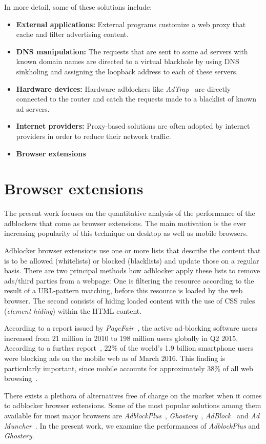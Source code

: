 In more detail, some of these solutions include:

\begin{itemize}
 \item \textbf{External applications:} External programs customize a web proxy that cache and filter advertising content.
 \item \textbf{DNS manipulation:} The requests that are sent to some ad servers with known domain names are directed to a virtual blackhole by using DNS sinkholing and assigning the loopback address to each of these servers.
 \item \textbf{Hardware devices:} Hardware adblockers like \textit{AdTrap}~\cite{adtrap} are directly connected to the router and catch the requests made to a blacklist of known ad servers.
 \item \textbf{Internet providers:} Proxy-based solutions are often adopted by internet providers in order to reduce their network traffic.
 \item \textbf{Browser extensions}
\end{itemize}

\section{Browser extensions}
The present work focuses on the quantitative analysis of the performance of the adblockers that come as browser extensions. The main motivation is the ever increasing popularity of this technique on desktop as well as mobile browsers.

Adblocker browser extensions use one or more lists that describe the content that is to be allowed (whitelists) or blocked (blacklists) and update those on a regular basis. There are two principal methods how adblocker apply these lists to remove ads/third parties from a webpage: One is filtering the resource according to the result of a URL-pattern matching, before this resource is loaded by the web browser. The second consists of hiding loaded content with the use of CSS rules (\textit{element hiding}) within the HTML content.

According to a report issued by \textit{PageFair}~\cite{pagefair_adblockers}, the active ad-blocking software users increased from 21 million in 2010 to 198 million users globally in Q2 2015. According to a further report~\cite{pagefair_adblockers_mobile}, 22\% of the world's 1.9 billion smartphone users were blocking ads on the mobile web as of March 2016. This finding is particularly important, since mobile accounts for approximately 38\% of all web browsing~\cite{pagefair_adblockers}.

There exists a plethora of alternatives free of charge on the market when it comes to adblocker browser extensions. Some of the most popular solutions among them available for most major browsers are \textit{AdblockPlus}~\cite{adblockplus}, \textit{Ghostery}~\cite{ghostery}, \textit{AdBlock}~\cite{adblock} and \textit{Ad Muncher}~\cite{admuncher}. In the present work, we examine the performances of \textit{AdblockPlus} and \textit{Ghostery}.